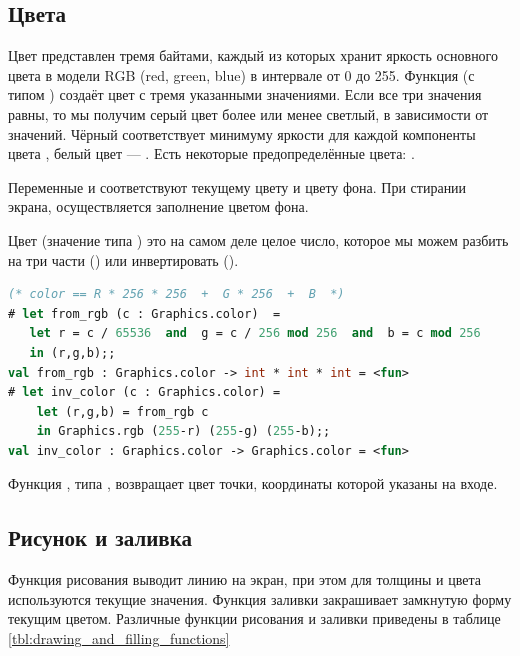 \subsection{Цвета}
\label{subsec:colors}

Цвет представлен тремя байтами, каждый из которых хранит яркость основного
цвета в модели RGB (red, green, blue) в интервале от 0 до 255. Функция 
 (с типом ) создаёт цвет с тремя 
указанными значениями. Если все три значения равны, то мы получим серый цвет 
более или менее светлый, в зависимости от значений. Чёрный соответствует 
минимуму яркости для каждой компоненты цвета , белый цвет --- 
. Есть некоторые предопределённые цвета: .

Переменные  и  соответствуют текущему 
цвету и цвету фона. При стирании экрана, осуществляется заполнение цветом фона.

Цвет (значение типа ) это на самом деле целое число, которое мы
можем разбить на три части () или инвертировать
().

\begin{lstlisting}[language=OCaml]
(* color == R * 256 * 256  +  G * 256  +  B  *)
# let from_rgb (c : Graphics.color)  =
   let r = c / 65536  and  g = c / 256 mod 256  and  b = c mod 256
   in (r,g,b);;
val from_rgb : Graphics.color -> int * int * int = <fun>
# let inv_color (c : Graphics.color) =
    let (r,g,b) = from_rgb c
    in Graphics.rgb (255-r) (255-g) (255-b);;
val inv_color : Graphics.color -> Graphics.color = <fun>
\end{lstlisting}

Функция , типа , возвращает
цвет точки, координаты которой указаны на входе.

\subsection{Рисунок и заливка}
\label{subsec:drawing_and_filling}

Функция рисования выводит линию на экран, при этом для толщины и цвета
используются текущие значения. Функция заливки закрашивает замкнутую форму
текущим цветом. Различные функции рисования и заливки приведены в таблице
\ref{tbl:drawing_and_filling_functions}

